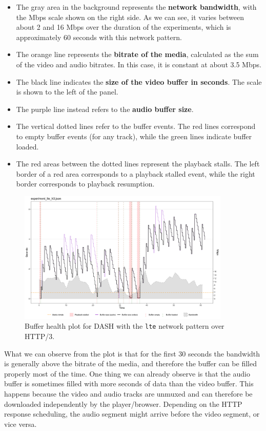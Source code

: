 \begin{itemize}
    \item The gray area in the background represents the \textbf{network bandwidth}, with the Mbps scale shown on the right side. As we can see, it varies between about 2 and 16 Mbps over the duration of the experiments, which is approximately 60 seconds with this network pattern.
    \item The orange line represents the \textbf{bitrate of the media}, calculated as the sum of the video and audio bitrates. In this case, it is constant at about 3.5 Mbps.
    \item The black line indicates the \textbf{size of the video buffer in seconds}. The scale is shown to the left of the panel.
    \item The purple line instead refers to the \textbf{audio buffer size}.
    \item The vertical dotted lines refer to the buffer events. The red lines correspond to empty buffer events (for any track), while the green lines indicate buffer loaded.
    \item The red areas between the dotted lines represent the playback stalls. The left border of a red area corresponds to a playback stalled event, while the right border corresponds to playback resumption.
\end{itemize}

\begin{figure}[h]
    \centering
    \includegraphics[width=0.9\textwidth]{res/eval_nonabr_lte_h3.png}
    \caption{Buffer health plot for DASH with the \texttt{lte} network pattern over HTTP/3.}
    \label{fig:eval_nonabr_lte_h3}
\end{figure}

What we can observe from the plot is that for the first 30 seconds the bandwidth is generally above the bitrate of the media, and therefore the buffer can be filled properly most of the time. One thing we can already observe is that the audio buffer is sometimes filled with more seconds of data than the video buffer. This happens because the video and audio tracks are unmuxed and can therefore be downloaded independently by the player/browser. Depending on the HTTP response scheduling, the audio segment might arrive before the video segment, or vice versa.

